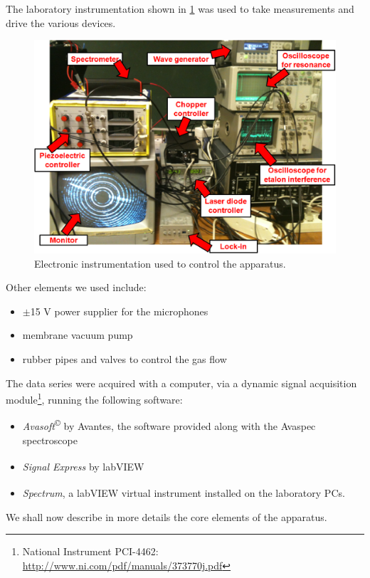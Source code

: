 The laboratory instrumentation shown in \cref{instrument} was used to take measurements and drive the various devices.
\begin{figure}[t]\centering
\includegraphics[width=\linewidth, draft=\foto]{eps/instrument.eps}
\caption{Electronic instrumentation used to control the apparatus.}
\label{instrument}
\end{figure}
Other elements we used include:
\begin{itemize}
\item $\pm$15 V power supplier for the microphones
\item membrane vacuum pump
\item rubber pipes and valves to control the gas flow
\end{itemize}
The data series were acquired with a computer, via a dynamic signal acquisition module\footnote{National Instrument PCI-4462: \url{http://www.ni.com/pdf/manuals/373770j.pdf}}, running the following software:
\begin{itemize}
\item \textit{Avasoft}\textsuperscript{\copyright} by Avantes, the software provided along with the Avaspec spectroscope
\item \textit{Signal Express}\textsuperscript{\texttrademark} by labVIEW\textsuperscript{\texttrademark}
\item \textit{Spectrum}, a labVIEW\textsuperscript{\texttrademark} virtual instrument installed on the laboratory PCs.
\end{itemize}
 We shall now describe in more details the core elements of the apparatus.
